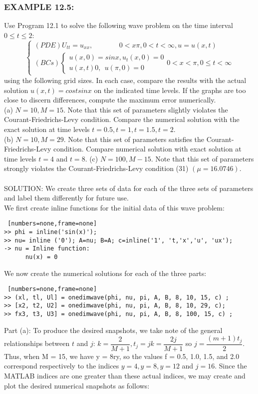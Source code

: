 \documentclass[../main.tex]{subfiles}
\begin{document}
\subsubsection{EXAMPLE 12.5:} Use Program 12.1 to solve the following wave problem on the time interval $0 \leqslant t \leqslant 2$: 
$$\begin{cases} 
	(PDE) U_{tt}=u_{xx}, ~~~~~~~~~~~~~~~~~ 0<x\pi , 0<t<\infty, u=u(x,t)\\ 
	(BCs)
	\begin{cases} 
	u(x,0)=sin x, u_t(x,0)=0\\
	u(x,t)0, ~~ u(\pi , 0)=0
	\end{cases}
	0<x<\pi, 0\leqslant t< \infty 
\end{cases}$$
using the following grid sizes. In each case, compare the results with the actual solution $u(x,t) = cos t sin x$ on the indicated time levels. If the graphs are too close to discern differences, compute the maximum error numerically.
\\
(a) $N= 10, M= 15$. Note that this set of parameters slightly violates the Courant-Friedrichs-Levy condition. Compare the numerical solution with the exact solution at time levels $t = 0.5, t = 1, t = 1.5, t = 2$. 
\\
(b) $N = 10, M = 29$. Note that this set of parameters satisfies the Courant-Friedrichs-Levy condition. Compare numerical solution with exact solution at time 
levels $t = 4$ and $t= 8$. 
(c) $N = 100, M - 15$. Note that this set of parameters strongly violates the Courant-Friedrichs-Levy condition (31) $(\mu = 16.0746)$.
\\
\\
SOLUTION: We create three sets of data for each of the three sets of parameters and label them differently for future use. 
\\

We first create inline functions for the initial data of this wave problem:

 
\begin{lstlisting} [numbers=none,frame=none]
>> phi = inline('sin(x)'); 
>> nu= inline ('0'); A=nu; B=A; c=inline('1', 't,'x','u', 'ux'); 
-> nu = Inline function: 
	  nu(x) = 0
\end{lstlisting}
 
We now create the numerical solutions for each of the three parts: 
\begin{lstlisting} [numbers=none,frame=none]
>> (xl, tl, Ul] = onedimwave(phi, nu, pi, A, B, 8, 10, 15, c) ; 
>> [x2, t2, U2] = onedimwave(phi, nu, pi, A, B, 8, 10, 29, c); 
>> fx3, t3, U3] = onedimwave(phi, nu, pi, A, B, 8, 100, 15, c) ;
\end{lstlisting}
Part (a): To produce the desired snapshots, we take note of the general relationships between $t$ and $j$: $k=\dfrac{2}{M+1}, t_j=jk=\dfrac{2j}{M+1}$ so $j=\dfrac{(m+1)t_j}{2}$.
Thus, when M = 15, we have y = 8ry, so the values f = 0.5, 1.0, 1.5, and 2.0 correspond respectively to the indices $y = 4, y = 8, y = 12$ and $j = 16$. Since the MATLAB indices are one greater than these actual indices, we may create and plot the desired numerical snapshots as follows: 
\end{document}
